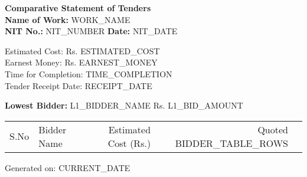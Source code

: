 \documentclass{article}
\begin{document}
\begin{center}
\textbf{Comparative Statement of Tenders}\\
\vspace{0.3cm}
\textbf{Name of Work:} {WORK_NAME}\\
\textbf{NIT No.:} {NIT_NUMBER} \quad \textbf{Date:} {NIT_DATE}
\end{center}

\vspace{0.5cm}
\noindent
Estimated Cost: Rs. {ESTIMATED_COST} \\ 
Earnest Money: Rs. {EARNEST_MONEY} \\ 
Time for Completion: {TIME_COMPLETION} \\ 
Tender Receipt Date: {RECEIPT_DATE} \\ 
\vspace{0.5cm}

\noindent
\textbf{Lowest Bidder:} {L1_BIDDER_NAME}  \quad Rs. {L1_BID_AMOUNT}\\
\vspace{0.5cm}

\begin{tabular}{|c|l|r|r|r|}
\hline
S.No & Bidder Name & Estimated Cost (Rs.) & Quoted %
\hline
{BIDDER_TABLE_ROWS}
\hline
\end{tabular}

\vfill
\noindent Generated on: {CURRENT_DATE}
\end{document}

